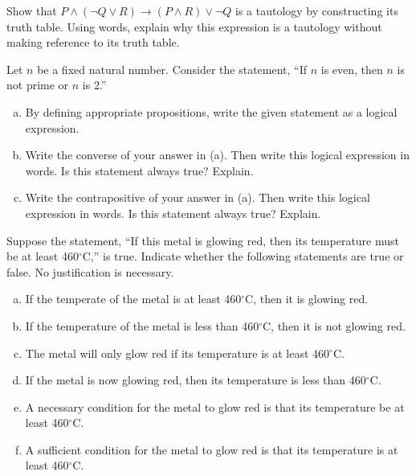 \documentclass[11pt,letterpaper]{article}
\begin{document}

 Show that $P \wedge (\neg Q \vee R) \to (P \wedge R) \vee \neg Q$ is a tautology by constructing its truth table. Using words, explain why this expression is a tautology without making reference to its truth table.



\newpage



 Let $n$ be a fixed natural number. Consider the statement, ``If $n$ is even, then $n$ is not prime or $n$ is 2.''
	\begin{enumerate}[(a)]
	\item By defining appropriate propositions, write the given statement as a logical expression.
	\item Write the converse of your answer in (a). Then write this logical expression in words. Is this statement always true? Explain.
	\item Write the contrapositive of your answer in (a). Then write this logical expression in words. Is this statement always true? Explain. 
	\end{enumerate} \pspace



\newpage



 Suppose the statement, ``If this metal is glowing red, then its temperature must be at least 460$^\circ$C,'' is true. Indicate whether the following statements are true or false. No justification is necessary.
	\begin{enumerate}[(a)]
	\item If the temperate of the metal is at least 460$^\circ$C, then it is glowing red.
	\item If the temperature of the metal is less than 460$^\circ$C, then it is not glowing red.
	\item The metal will only glow red if its temperature is at least 460$^\circ$C.
	\item If the metal is now glowing red, then its temperature is less than 460$^\circ$C.
	\item A necessary condition for the metal to glow red is that its temperature be at least 460$^\circ$C.
	\item A sufficient condition for the metal to glow red is that its temperature is at least 460$^\circ$C.
	\end{enumerate}
\end{document}
